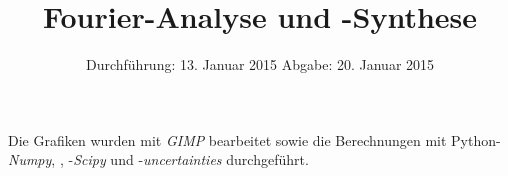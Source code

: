 
\subject{Anfängerpraktikum Versuch V351}
\title{Fourier-Analyse und -Synthese}
\date{
  Durchführung: 13. Januar 2015
  \hspace{3em}
  Abgabe: 20. Januar 2015
}


\maketitle
\thispagestyle{empty}
\newpage





\printbibliography
Die Grafiken wurden mit \textit{GIMP}\cite{gimp} bearbeitet sowie die Berechnungen mit Python-\textit{Numpy}, \cite{numpy}, -\textit{Scipy}\cite{scipy} und -\textit{uncertainties}\cite{uncertainties} durchgeführt.

